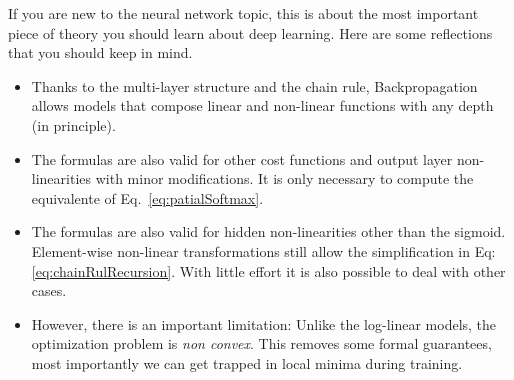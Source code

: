 If you are new to the neural network topic, this is about the most important
piece of theory you should learn about deep learning. Here are some reflections
that you should keep in mind.

\begin{itemize}
\item Thanks to the multi-layer structure and the chain rule, Backpropagation allows models that compose linear and non-linear functions with any depth (in principle\footnotemark). 

\item The formulas are also valid for other cost functions and output layer non-linearities with minor modifications. It is only necessary to compute the equivalente of Eq.~\ref{eq:patialSoftmax}. 

\item The formulas are also valid for hidden non-linearities other than the sigmoid. Element-wise non-linear transformations still allow the simplification in Eq: \ref{eq:chainRulRecursion}. With little effort it is also possible to deal with other cases.

\item However, there is an important limitation: Unlike the log-linear models, the optimization problem is \textit{non convex}. This removes some formal guarantees, most importantly we can get trapped in local minima during training.
\end{itemize}


%
%
%

